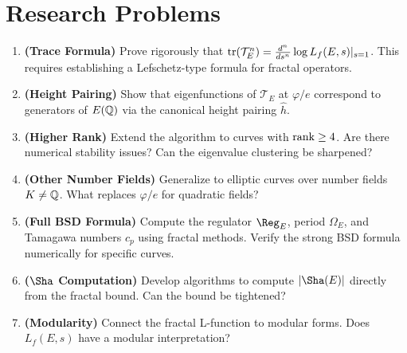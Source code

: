 \section*{Research Problems}

\begin{enumerate}
\item \textbf{(Trace Formula)} Prove rigorously that $\tr(\mathcal{T}_E^n) = \frac{d^n}{ds^n} \log L_f(E,s)|_{s=1}$. This requires establishing a Lefschetz-type formula for fractal operators.

\item \textbf{(Height Pairing)} Show that eigenfunctions of $\mathcal{T}_E$ at $\varphi/e$ correspond to generators of $E(\mathbb{Q})$ via the canonical height pairing $\hat{h}$.

\item \textbf{(Higher Rank)} Extend the algorithm to curves with $\rank \geq 4$. Are there numerical stability issues? Can the eigenvalue clustering be sharpened?

\item \textbf{(Other Number Fields)} Generalize to elliptic curves over number fields $K \neq \mathbb{Q}$. What replaces $\varphi/e$ for quadratic fields?

\item \textbf{(Full BSD Formula)} Compute the regulator $\Reg_E$, period $\Omega_E$, and Tamagawa numbers $c_p$ using fractal methods. Verify the strong BSD formula numerically for specific curves.

\item \textbf{($\Sha$ Computation)} Develop algorithms to compute $|\Sha(E)|$ directly from the fractal bound. Can the bound be tightened?

\item \textbf{(Modularity)} Connect the fractal L-function to modular forms. Does $L_f(E,s)$ have a modular interpretation?
\end{enumerate}

